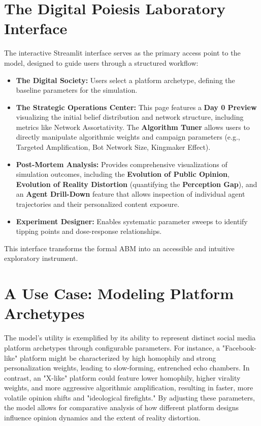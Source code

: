 \documentclass[10pt,a4paper]{article}
\begin{document}
\section{The Digital Poiesis Laboratory Interface}
\label{sec:interface}
The interactive Streamlit interface serves as the primary access point to the model, designed to guide users through a structured workflow:
\begin{itemize}
    \item \textbf{The Digital Society:} Users select a platform archetype, defining the baseline parameters for the simulation.
    \item \textbf{The Strategic Operations Center:} This page features a \textbf{Day 0 Preview} visualizing the initial belief distribution and network structure, including metrics like Network Assortativity. The \textbf{Algorithm Tuner} allows users to directly manipulate algorithmic weights and campaign parameters (e.g., Targeted Amplification, Bot Network Size, Kingmaker Effect).
    \item \textbf{Post-Mortem Analysis:} Provides comprehensive visualizations of simulation outcomes, including the \textbf{Evolution of Public Opinion}, \textbf{Evolution of Reality Distortion} (quantifying the \textbf{Perception Gap}), and an \textbf{Agent Drill-Down} feature that allows inspection of individual agent trajectories and their personalized content exposure.
    \item \textbf{Experiment Designer:} Enables systematic parameter sweeps to identify tipping points and dose-response relationships.
\end{itemize}
This interface transforms the formal ABM into an accessible and intuitive exploratory instrument.

\section{A Use Case: Modeling Platform Archetypes}
\label{sec:use_case}
The model's utility is exemplified by its ability to represent distinct social media platform archetypes through configurable parameters. For instance, a "Facebook-like" platform might be characterized by high homophily and strong personalization weights, leading to slow-forming, entrenched echo chambers. In contrast, an "X-like" platform could feature lower homophily, higher virality weights, and more aggressive algorithmic amplification, resulting in faster, more volatile opinion shifts and "ideological firefights." By adjusting these parameters, the model allows for comparative analysis of how different platform designs influence opinion dynamics and the extent of reality distortion.
\end{document}
